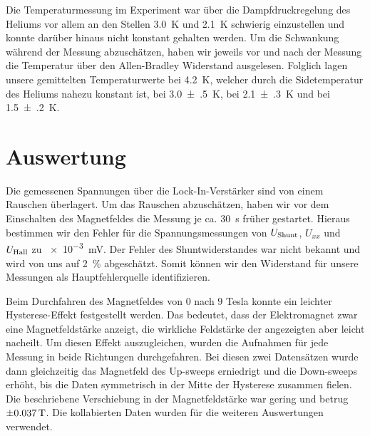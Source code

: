 \documentclass[paper=a4,fontsize=10pt,DIV=18,twocolumn,parskip=half]{scrartcl}
\numberwithin{equation}{section}    %
\newcommand{\kor}[1]{{\color{darkgreen}#1}}
\begin{document}
Die Temperaturmessung im Experiment war über die Dampfdruckregelung des Heliums vor allem an den Stellen \SI{3.0}{\kelvin} und \SI{2.1}{\kelvin} schwierig einzustellen und konnte darüber hinaus nicht konstant gehalten werden. Um die Schwankung während der Messung abzuschätzen, haben wir jeweils vor und nach der Messung die Temperatur über den Allen-Bradley Widerstand ausgelesen. Folglich lagen unsere gemittelten Temperaturwerte bei \SI{4.2}{\kelvin}, welcher durch die Sidetemperatur des Heliums nahezu konstant ist, bei \SI{3.0(5)}{\kelvin}, bei \SI{2.1(3)}{\kelvin} und bei \SI{1.5(2)}{\kelvin}. 


%
\section{Auswertung}
\label{Auswertung}
%



Die gemessenen Spannungen über die Lock-In-Verstärker sind von einem Rauschen überlagert. Um das Rauschen abzuschätzen, haben wir vor dem Einschalten des Magnetfeldes die Messung je ca. \SI{30}{\second} früher gestartet. Hieraus bestimmen wir den Fehler für die Spannungsmessungen von $U_{\rm Shunt}$, $U_{xx}$ und $U_{\rm Hall}$ zu \SI{e-3}{\milli\volt}. Der Fehler des Shuntwiderstandes war nicht bekannt und wird von uns auf \kor{\SI{2}{\percent}} abgeschätzt. Somit können wir den Widerstand für unsere Messungen als Hauptfehlerquelle identifizieren.

Beim Durchfahren des Magnetfeldes von $0$ nach $9$ Tesla konnte ein leichter Hysterese-Effekt festgestellt werden. Das bedeutet, dass der Elektromagnet zwar eine Magnetfeldstärke anzeigt, die wirkliche Feldstärke der angezeigten aber leicht nacheilt. Um diesen Effekt auszugleichen, wurden die Aufnahmen für jede Messung in beide 
Richtungen durchgefahren. Bei diesen zwei Datensätzen wurde dann gleichzeitig das Magnetfeld des Up-sweeps erniedrigt und die Down-sweeps erhöht, bis die Daten symmetrisch in der Mitte der Hysterese zusammen fielen.
Die beschriebene Verschiebung in der Magnetfeldstärke war gering und betrug $\SI{\pm0.037}{\tesla}$. Die kollabierten Daten wurden für die weiteren Auswertungen verwendet.
\end{document}
